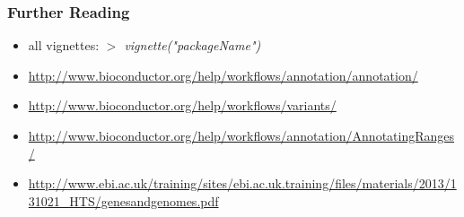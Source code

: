 \documentclass{beamer}\usepackage[]{graphicx}\usepackage[]{color}
\begin{document}
\begin{frame}
  \frametitle{Further Reading}
  \begin{itemize}
  \item  all vignettes: \textit{$>$ vignette("packageName")}
    \vfill
  \item \url{http://www.bioconductor.org/help/workflows/annotation/annotation/}
  \item \url{http://www.bioconductor.org/help/workflows/variants/}
  \item \url{http://www.bioconductor.org/help/workflows/annotation/AnnotatingRanges/}
    \vfill
  \item \url{http://www.ebi.ac.uk/training/sites/ebi.ac.uk.training/files/materials/2013/131021_HTS/genesandgenomes.pdf}
  \end{itemize}
\end{frame}
\end{document}

